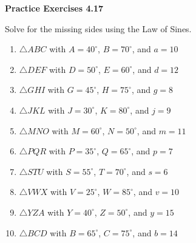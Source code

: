 \vspace{0.3ex}
\noindent\textbf{Practice Exercises 4.17}

\vspace{0.2ex}

Solve for the missing sides using the Law of Sines. 

\begin{enumerate}
    \item \(\triangle ABC\) with \(A = 40^\circ\), \(B = 70^\circ\), and \(a = 10\)
    \item \(\triangle DEF\) with \(D = 50^\circ\), \(E = 60^\circ\), and \(d = 12\)
    \item \(\triangle GHI\) with \(G = 45^\circ\), \(H = 75^\circ\), and \(g = 8\)
    \item \(\triangle JKL\) with \(J = 30^\circ\), \(K = 80^\circ\), and \(j = 9\)
    \item \(\triangle MNO\) with \(M = 60^\circ\), \(N = 50^\circ\), and \(m = 11\)
    \item \(\triangle PQR\) with \(P = 35^\circ\), \(Q = 65^\circ\), and \(p = 7\)
    \item \(\triangle STU\) with \(S = 55^\circ\), \(T = 70^\circ\), and \(s = 6\)
    \item \(\triangle VWX\) with \(V = 25^\circ\), \(W = 85^\circ\), and \(v = 10\)
    \item \(\triangle YZA\) with \(Y = 40^\circ\), \(Z = 50^\circ\), and \(y = 15\)
    \item \(\triangle BCD\) with \(B = 65^\circ\), \(C = 75^\circ\), and \(b = 14\)
\end{enumerate}
